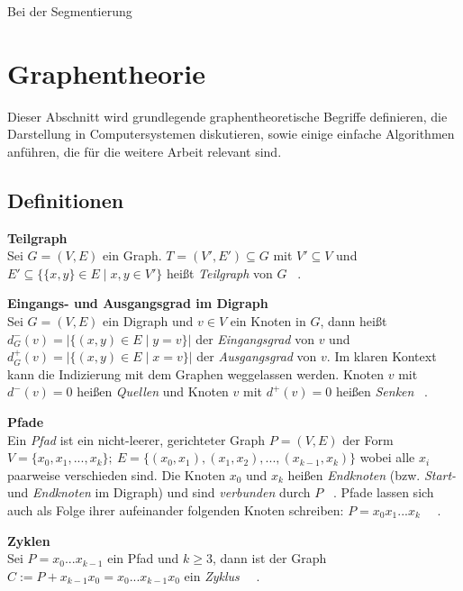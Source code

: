 Bei der Segmentierung 



\section{Graphentheorie}

Dieser Abschnitt wird grundlegende graphentheoretische Begriffe definieren, die Darstellung in Computersystemen diskutieren, sowie einige einfache Algorithmen anführen, die für die weitere Arbeit relevant sind.

\subsection{Definitionen}


\textbf{Teilgraph} \\
Sei $G = (V, E)$ ein Graph. $T = (V', E') \subseteq G$ mit $V' \subseteq V$ und $E' \subseteq \{\{x,y\} \in E \mid x, y \in V'\}$ heißt \textit{Teilgraph} von $G$ ~\cite[S.~4]{Diestel.2016}.  


\textbf{Eingangs- und Ausgangsgrad im Digraph} \\
Sei $G = (V, E)$ ein Digraph und $v \in V$ ein Knoten in $G$, dann heißt $d^-_G(v) = | \{(x, y) \in E \mid y = v\} |$ der \textit{Eingangsgrad} von $v$ und $d^+_G(v) = | \{(x, y) \in E \mid x = v\} |$ der \textit{Ausgangsgrad} von $v$. Im klaren Kontext kann die Indizierung mit dem Graphen weggelassen werden. Knoten $v$ mit $d^-(v) = 0$ heißen  \textit{Quellen} und Knoten $v$ mit $d^+(v) = 0$ heißen  \textit{Senken} ~\cite[S.~460]{Satyanarayana.2014}.

\textbf{Pfade} \\ 
Ein \textit{Pfad} ist ein nicht-leerer, gerichteter Graph $P = (V, E)$ der Form $V = \{x_0, x_1, ..., x_k\};~E=\{(x_0,x_1), (x_1, x_2), ..., (x_{k-1}, x_k)\}$ wobei alle $x_i$ paarweise verschieden sind. Die Knoten $x_0$ und $x_k$ heißen \textit{Endknoten} (bzw. \textit{Start-} und \textit{Endknoten} im Digraph) und sind \textit{verbunden} durch $P$ ~\cite[S.~6]{Diestel.2016}. Pfade lassen sich auch als Folge ihrer aufeinander folgenden Knoten schreiben: $P = x_0x_1...x_k$ ~\cite[S.~7]{Diestel.2016}~\cite[S.~475]{Sedgewick.1992}. 


\textbf{Zyklen} \\
Sei $P = x_0...x_{k-1}$ ein Pfad und $k \geq 3$, dann ist der Graph $C := P + x_{k-1}x_0 = x_0...x_{k-1}x_0$ ein \textit{Zyklus} ~\cite[S.~8]{Diestel.2016}~\cite[S.~475]{Sedgewick.1992}.


